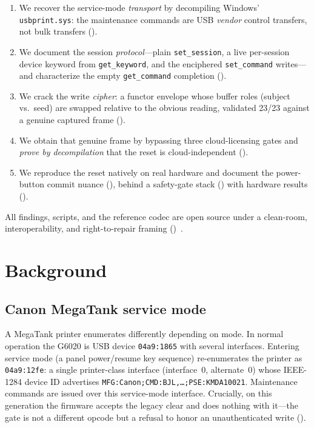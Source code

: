 \documentclass[conference]{IEEEtran}
\begin{document}
\begin{enumerate}
\item We recover the service-mode \emph{transport} by decompiling
  Windows' \texttt{usbprint.sys}: the maintenance commands are USB
  \emph{vendor} control transfers, not bulk transfers
  ().
\item We document the session \emph{protocol}---plain
  \texttt{set\_session}, a live per-session device keyword from
  \texttt{get\_keyword}, and the enciphered \texttt{set\_command}
  writes---and characterize the empty \texttt{get\_command} completion
  ().
\item We crack the write \emph{cipher}: a functor envelope whose buffer
  roles (subject vs.\ seed) are swapped relative to the obvious reading,
  validated 23/23 against a genuine captured frame ().
\item We obtain that genuine frame by bypassing three cloud-licensing
  gates and \emph{prove by decompilation} that the reset is
  cloud-independent ().
\item We reproduce the reset natively on real hardware and document the
  power-button commit nuance (), behind a safety-gate
  stack () with hardware results ().
\end{enumerate}

All findings, scripts, and the reference codec are open source under a
clean-room, interoperability, and right-to-repair framing
()~\cite{canon-megatank-reset}.

\section{Background}
\label{sec:background}

\subsection{Canon MegaTank service mode}
\label{sec:bg-servicemode}

A MegaTank printer enumerates differently depending on mode. In normal
operation the G6020 is USB device \texttt{04a9:1865} with several
interfaces. Entering service mode (a panel power/resume key sequence)
re-enumerates the printer as \texttt{04a9:12fe}: a single printer-class
interface (interface~0, alternate~0) whose IEEE-1284 device ID advertises
\texttt{MFG:Canon;CMD:BJL,\ldots;PSE:KMDA10021}. Maintenance commands are
issued over this service-mode interface. Crucially, on this generation the
firmware accepts the legacy clear and does nothing with it---the gate is
not a different opcode but a refusal to honor an unauthenticated write
().
\end{document}
